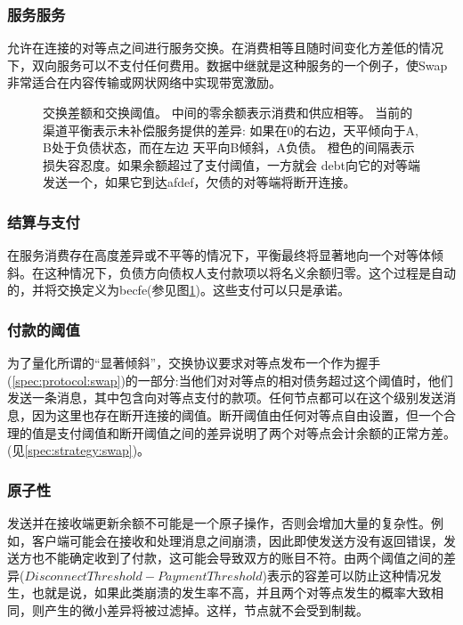 \subsubsection{服务服务}

允许在连接的对等点之间进行服务交换。在消费相等且随时间变化方差低的情况下，双向服务可以不支付任何费用。数据中继就是这种服务的一个例子，使Swap非常适合在内容传输或网状网络中实现带宽激励。

\begin{figure}[htbp]

\caption[交换差额和交换阈值\statusgreen]{交换差额和交换阈值。
中间的零余额表示消费和供应相等。
当前的渠道平衡表示未补偿服务提供的差异:
如果在0的右边，天平倾向于A, B处于负债状态，而在左边
天平向B倾斜，A负债。
橙色的间隔表示损失容忍度。如果余额超过了支付阈值，一方就会
debt向它的对等端发送一个，如果它到达afdef，欠债的对等端将断开连接。}
\label{fig:swap}
\end{figure}

\subsubsection{结算与支付}

在服务消费存在高度差异或不平等的情况下，平衡最终将显著地向一个对等体倾斜。在这种情况下，负债方向债权人支付款项以将名义余额归零。这个过程是自动的，并将交换定义为becfe(参见图\ref{fig:swap})。这些支付可以只是承诺。


\subsubsection{付款的阈值}

为了量化所谓的“显著倾斜”，交换协议要求对等点发布一个作为握手(\ref{spec:protocol:swap})的一部分:当他们对对等点的相对债务超过这个阈值时，他们发送一条消息，其中包含向对等点支付的款项。任何节点都可以在这个级别发送消息，因为这里也存在断开连接的阈值。断开阈值由任何对等点自由设置，但一个合理的值是支付阈值和断开阈值之间的差异说明了两个对等点会计余额的正常方差。(见\ref{spec:strategy:swap})。 


\subsubsection{原子性}

发送并在接收端更新余额不可能是一个原子操作，否则会增加大量的复杂性。例如，客户端可能会在接收和处理消息之间崩溃，因此即使发送方没有返回错误，发送方也不能确定收到了付款，这可能会导致双方的账目不符。由两个阈值之间的差异($\mathit{DisconnectThreshold}-\mathit{PaymentThreshold}$)表示的容差可以防止这种情况发生，也就是说，如果此类崩溃的发生率不高，并且两个对等点发生的概率大致相同，则产生的微小差异将被过滤掉。这样，节点就不会受到制裁。

